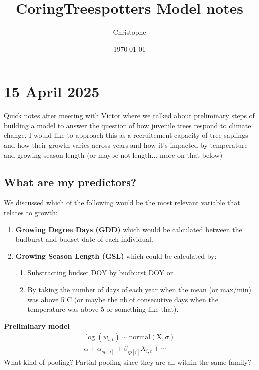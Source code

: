 \documentclass[a4paper,12pt]{article}
\title{CoringTreespotters Model notes}
\author{Christophe}
\date{\today}
\begin{document}
\maketitle

\section*{15 April 2025}
Quick notes after meeting with Victor where we talked about preliminary steps of building a model to answer the question of how juvenile trees respond to climate change. I would like to approach this as a recruitement capacity of tree saplings and how their growth varies across years and how it's impacted by temperature and growing season length (or maybe not length... more on that below)

\subsection*{What are my predictors?}
We discussed which of the following would be the most relevant variable that relates to growth:
\begin{enumerate}
	\item \textbf{Growing Degree Days (GDD)} which would be calculated between the budburst and budset date of each individual. 
	\item \textbf{Growing Season Length (GSL)} which could be calculated by:
	\begin{enumerate}
		\item Substracting budset DOY by budburst DOY or 
		\item By taking the number of days of each year when the mean (or max/min) was above 5$^{\circ}$C (or maybe the nb of consecutive days when the temperature was above 5 or something like that).
	\end{enumerate}
\end{enumerate}

\par
\textbf{Preliminary model} \\ 
\begin{align}
	\log (w_{i,t}) \sim \text{normal}(\text{X}, \sigma) \\
	\alpha + \alpha_{sp[i]} + \beta_{sp[i]} X_{i,t} + \cdots
\end{align} 
What kind of pooling? Partial pooling since they are all within the same family?


\end{document}
